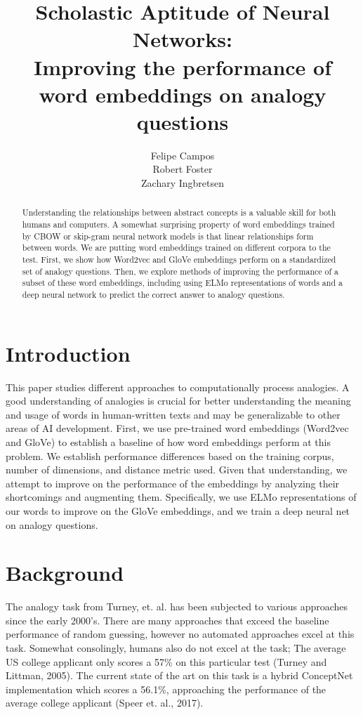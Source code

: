 \documentclass[11pt]{article}
\title{%
  Scholastic Aptitude of Neural Networks: \\
  \large Improving the performance of word embeddings on analogy questions
}
\author{Felipe Campos \\\And
  Robert Foster \\\And
  Zachary Ingbretsen \\
}
\date{}
\begin{document}
\maketitle
\begin{abstract}
  Understanding the relationships between abstract concepts is a valuable skill for both humans and computers. A somewhat surprising property of word embeddings trained by CBOW or skip-gram neural network models is that linear relationships form between words. We are putting word embeddings trained on different corpora to the test. First, we show how Word2vec and GloVe embeddings perform on a standardized set of analogy questions. Then, we explore methods of improving the performance of a subset of these word embeddings, including using ELMo representations of words and a deep neural network to predict the correct answer to analogy questions.
\end{abstract}

\section{Introduction}

This paper studies different approaches to computationally process
analogies. A good understanding of analogies is crucial for better
understanding the meaning and usage of words in human-written texts and
may be generalizable to other areas of AI development. First, we use
pre-trained word embeddings (Word2vec and GloVe) to establish a baseline
of how word embeddings perform at this problem. We establish performance
differences based on the training corpus, number of dimensions, and
distance metric used. Given that understanding, we attempt to improve on
the performance of the embeddings by analyzing their shortcomings and
augmenting them. Specifically, we use ELMo representations of our words
to improve on the GloVe embeddings, and we train a deep neural net on
analogy questions.

\section{Background}

The analogy task from Turney, et. al. has been subjected to various
approaches since the early 2000's. There are many approaches that exceed
the baseline performance of random guessing, however no automated
approaches excel at this task. Somewhat consolingly, humans also do not
excel at the task; The average US college applicant only scores a 57\%
on this particular test (Turney and Littman, 2005). The current state of
the art on this task is a hybrid ConceptNet implementation which scores
a 56.1\%, approaching the performance of the average college
applicant (Speer et. al., 2017).
\end{document}

